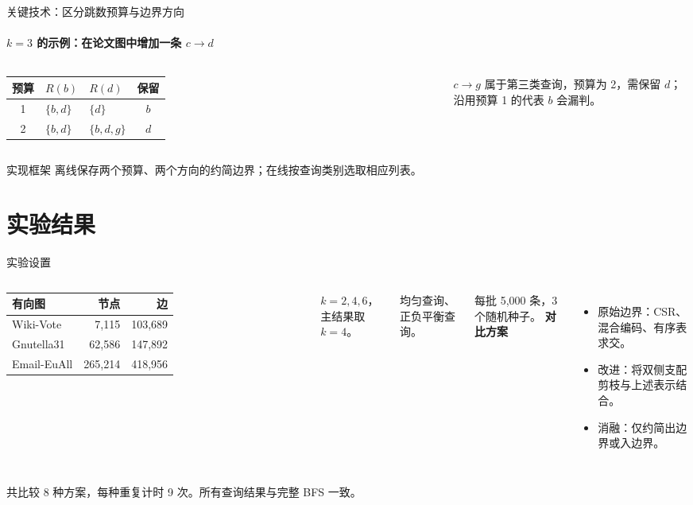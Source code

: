 \begin{frame}{关键技术：区分跳数预算与边界方向}
\framesubtitle{$k=3$ 的示例：在论文图中增加一条 $c\to d$}
\begin{columns}[c,onlytextwidth]
\centering
{}\par\vspace{1mm}
{\fontsize{11}{13}\selectfont\setlength{\tabcolsep}{3pt}
\begin{tabular}{@{}cllc@{}}\toprule
预算 & $R(b)$ & $R(d)$ & 保留\\\midrule
1 & $\{b,d\}$ & $\{d\}$ & $b$\\[1mm]
2 & $\{b,d\}$ & $\{b,d,g\}$ & $d$\\\bottomrule
\end{tabular}}\par\vspace{1mm}
\fontsize{11}{13}\selectfont
$c\to g$ 属于第三类查询，预算为 2，需保留 $d$；沿用预算 1 的代表 $b$ 会漏判。
\end{columns}
\begin{block}{实现框架}
离线保存两个预算、两个方向的约简边界；在线按查询类别选取相应列表。
\end{block}
\end{frame}

\section{实验结果}
\begin{frame}{实验设置}
\begin{columns}[T,onlytextwidth]
\begin{tabular}{@{}lrr@{}}\toprule
有向图 & 节点 & 边\\\midrule
Wiki-Vote & 7,115 & 103,689\\
Gnutella31 & 62,586 & 147,892\\
Email-EuAll & 265,214 & 418,956\\\bottomrule
\end{tabular}\par\vspace{3mm}
$k=2,4,6$，主结果取 $k=4$。\par
均匀查询、正负平衡查询。\par
每批 5,000 条，3 个随机种子。
\textbf{对比方案}\par\vspace{1mm}
\begin{itemize}
\item 原始边界：CSR、混合编码、有序表求交。
\item 改进：将双侧支配剪枝与上述表示结合。
\item 消融：仅约简出边界或入边界。
\end{itemize}
\end{columns}
\par\vspace{2mm}
共比较 8 种方案，每种重复计时 9 次。所有查询结果与完整 BFS 一致。
\end{frame}


